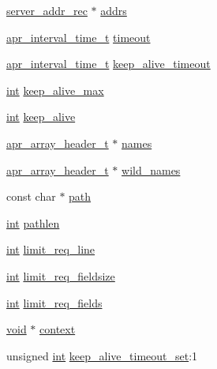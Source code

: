 \begin{DoxyCompactItemize}
\item 
\hyperlink{structserver__addr__rec}{server\+\_\+addr\+\_\+rec} $\ast$ \hyperlink{structserver__rec_a8caec41019feeb054418b6af738cdf67}{addrs}
\item 
\hyperlink{group__apr__time_gaae2129185a395cc393f76fabf4f43e47}{apr\+\_\+interval\+\_\+time\+\_\+t} \hyperlink{structserver__rec_a34ba2512b6d2d1bdb08ca9bff3615b80}{timeout}
\item 
\hyperlink{group__apr__time_gaae2129185a395cc393f76fabf4f43e47}{apr\+\_\+interval\+\_\+time\+\_\+t} \hyperlink{structserver__rec_a62696ff217da3f6da55ae3415364da3d}{keep\+\_\+alive\+\_\+timeout}
\item 
\hyperlink{pcre_8txt_a42dfa4ff673c82d8efe7144098fbc198}{int} \hyperlink{structserver__rec_a84f18ce5406ec7b4ded3e230ae75340e}{keep\+\_\+alive\+\_\+max}
\item 
\hyperlink{pcre_8txt_a42dfa4ff673c82d8efe7144098fbc198}{int} \hyperlink{structserver__rec_a715a217fd606373e0039f81a3e4b654c}{keep\+\_\+alive}
\item 
\hyperlink{structapr__array__header__t}{apr\+\_\+array\+\_\+header\+\_\+t} $\ast$ \hyperlink{structserver__rec_a650728c44a16d833908075a6481ea707}{names}
\item 
\hyperlink{structapr__array__header__t}{apr\+\_\+array\+\_\+header\+\_\+t} $\ast$ \hyperlink{structserver__rec_abc770038c73cf49b3cdbd975de2ffbac}{wild\+\_\+names}
\item 
const char $\ast$ \hyperlink{structserver__rec_a225ec9e578ea235f3f8a8dcf5925eda7}{path}
\item 
\hyperlink{pcre_8txt_a42dfa4ff673c82d8efe7144098fbc198}{int} \hyperlink{structserver__rec_a32311990957c8b65ad7f3e3790f01ba1}{pathlen}
\item 
\hyperlink{pcre_8txt_a42dfa4ff673c82d8efe7144098fbc198}{int} \hyperlink{structserver__rec_a40a887a3321667e38cfbaf7d683bcbcf}{limit\+\_\+req\+\_\+line}
\item 
\hyperlink{pcre_8txt_a42dfa4ff673c82d8efe7144098fbc198}{int} \hyperlink{structserver__rec_a81f271941b6f7c1adb696cbe878d4884}{limit\+\_\+req\+\_\+fieldsize}
\item 
\hyperlink{pcre_8txt_a42dfa4ff673c82d8efe7144098fbc198}{int} \hyperlink{structserver__rec_a8488a7e27a3c634bf53c1e50513d002e}{limit\+\_\+req\+\_\+fields}
\item 
\hyperlink{group__MOD__ISAPI_gacd6cdbf73df3d9eed42fa493d9b621a6}{void} $\ast$ \hyperlink{structserver__rec_aa669ee5658c265c18f9bd7dfa080a26b}{context}
\item 
unsigned \hyperlink{pcre_8txt_a42dfa4ff673c82d8efe7144098fbc198}{int} \hyperlink{structserver__rec_ad2b411cc66bcf99e7944d8f88fad9ac6}{keep\+\_\+alive\+\_\+timeout\+\_\+set}\+:1
\end{DoxyCompactItemize}


